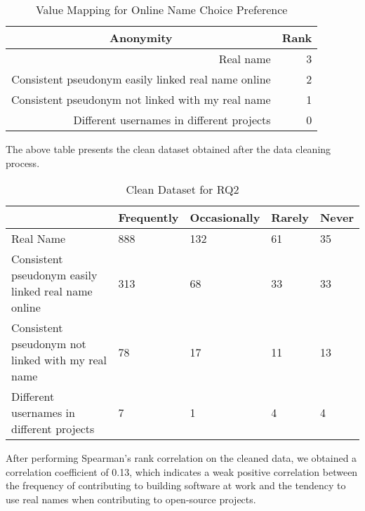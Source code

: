 \documentclass[journal,12pt,onecolumn,]{IEEEtran}
\begin{document}
\begin{table}[h]
    \centering
    \caption{Value Mapping for Online Name Choice Preference}
    \begin{tabular}{|r|r|}
        \hline
        \multicolumn{1}{|c|}{\textbf{Anonymity}}            & \multicolumn{1}{c|}{\textbf{Rank}} \\ \hline
        Real name                                           & 3                                  \\ \hline
        Consistent pseudonym easily linked real name online & 2                                  \\ \hline
        Consistent pseudonym not linked with my real name   & 1                                  \\ \hline
        Different usernames in different projects           & 0                                  \\ \hline
    \end{tabular}
\end{table}
The above table presents the clean dataset obtained after the data cleaning process.
\begin{table}[h]
    \centering
    \caption{Clean Dataset for RQ2}
    \begin{tabular}{l|llll}
               & Frequently& Occasionally   & Rarely  & Never\\ \hline
        Real Name & 888   & 132 & 61 & 35       \\
        Consistent pseudonym easily linked real name online      & 313   & 68  & 33 & 33       \\
        Consistent pseudonym not linked with my real name      & 78    & 17  & 11 & 13       \\
        Different usernames in different projects  & 7     & 1   & 4  & 4        \\
    \end{tabular}
\end{table}

After performing Spearman's rank correlation on the cleaned data, we obtained a correlation coefficient of 0.13, which indicates a weak positive correlation between the frequency of contributing to building software at work and the tendency to use real names when contributing to open-source projects.
\end{document}
